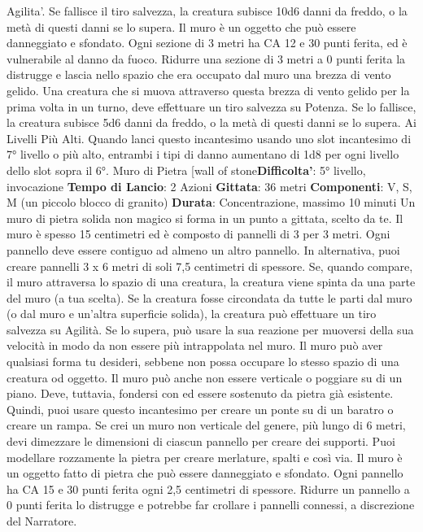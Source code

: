 \begin{multicols}{2}
Agilita'. Se fallisce il tiro salvezza, la creatura
subisce 10d6 danni da freddo, o la metà di questi danni
se lo supera.
Il muro è un oggetto che può essere danneggiato e
sfondato. Ogni sezione di 3 metri ha CA 12 e 30 punti
ferita, ed è vulnerabile al danno da fuoco. Ridurre una
sezione di 3 metri a 0 punti ferita la distrugge e lascia
nello spazio che era occupato dal muro una brezza di
vento gelido. Una creatura che si muova attraverso
questa brezza di vento gelido per la prima volta in un
turno, deve effettuare un tiro salvezza su Potenza.
Se lo fallisce, la creatura subisce 5d6 danni da freddo,
o la metà di questi danni se lo supera.
Ai Livelli Più Alti. Quando lanci questo incantesimo
usando uno slot incantesimo di 7° livello o più alto,
entrambi i tipi di danno aumentano di 1d8 per ogni
livello dello slot sopra il 6°.
Muro di Pietra
[wall of stone\textbf{Difficolta'}:
5° livello, invocazione
\textbf{Tempo di Lancio}: 2 Azioni
\textbf{Gittata}: 36 metri
\textbf{Componenti}: V, S, M (un piccolo blocco di granito)
\textbf{Durata}: Concentrazione, massimo 10 minuti
Un muro di pietra solida non magico si forma in un
punto a gittata, scelto da te. Il muro è spesso 15
centimetri ed è composto di pannelli di 3 per 3 metri.
Ogni pannello deve essere contiguo ad almeno un altro
pannello. In alternativa, puoi creare pannelli 3 x 6 metri
di soli 7,5 centimetri di spessore.
Se, quando compare, il muro attraversa lo spazio di una
creatura, la creatura viene spinta da una parte del muro
(a tua scelta). Se la creatura fosse circondata da tutte le
parti dal muro (o dal muro e un’altra superficie solida),
la creatura può effettuare un tiro salvezza su Agilità.
Se lo supera, può usare la sua reazione per muoversi
della sua velocità in modo da non essere più
intrappolata nel muro.
Il muro può aver qualsiasi forma tu desideri, sebbene
non possa occupare lo stesso spazio di una creatura od
oggetto. Il muro può anche non essere verticale o
poggiare su di un piano. Deve, tuttavia, fondersi con ed
essere sostenuto da pietra già esistente. Quindi, puoi
usare questo incantesimo per creare un ponte su di un
baratro o creare un rampa.
Se crei un muro non verticale del genere, più lungo di 6
metri, devi dimezzare le dimensioni di ciascun pannello
per creare dei supporti. Puoi modellare rozzamente la
pietra per creare merlature, spalti e così via.
Il muro è un oggetto fatto di pietra che può essere
danneggiato e sfondato. Ogni pannello ha CA 15 e 30
punti ferita ogni 2,5 centimetri di spessore. Ridurre un
pannello a 0 punti ferita lo distrugge e potrebbe far
crollare i pannelli connessi, a discrezione del Narratore.

\end{multicols}
